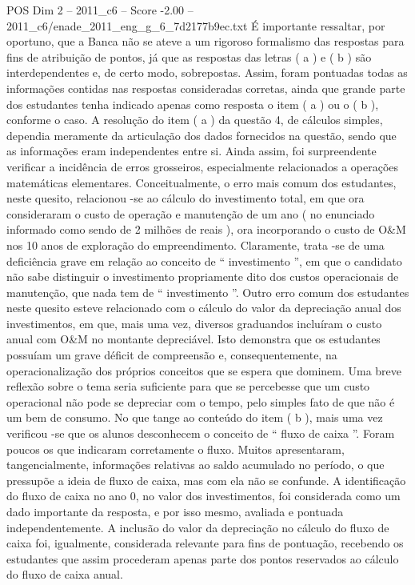 \begin{textsample}{POS Dim 2 – 2011\_c6 – Score -2.00 – 2011\_c6/enade\_2011\_eng\_g\_6\_7d2177b9ec.txt}
É importante ressaltar, por oportuno, que a Banca não se ateve a um rigoroso formalismo das respostas para fins de atribuição de pontos, já que as respostas das letras ( a ) e ( b ) são interdependentes e, de certo modo, sobrepostas.
Assim, foram pontuadas todas as informações contidas nas respostas consideradas corretas, ainda que grande parte dos estudantes tenha indicado apenas como resposta o item ( a ) ou o ( b ), conforme o caso.
A resolução do item ( a ) da questão 4, de cálculos simples, dependia meramente da articulação dos dados fornecidos na questão, sendo que as informações eram independentes entre si.
Ainda assim, foi surpreendente verificar a incidência de erros grosseiros, especialmente relacionados a operações matemáticas elementares.
Conceitualmente, o erro mais comum dos estudantes, neste quesito, relacionou -se ao cálculo do investimento total, em que ora consideraram o custo de operação e manutenção de um ano ( no enunciado informado como sendo de 2 milhões de reais ), ora incorporando o custo de O\&M nos 10 anos de exploração do empreendimento.
Claramente, trata -se de uma deficiência grave em relação ao conceito de “ investimento ”, em que o candidato não sabe distinguir o investimento propriamente dito dos custos operacionais de manutenção, que nada tem de “ investimento ”.
Outro erro comum dos estudantes neste quesito esteve relacionado com o cálculo do valor da depreciação anual dos investimentos, em que, mais uma vez, diversos graduandos incluíram o custo anual com O\&M no montante depreciável.
Isto demonstra que os estudantes possuíam um grave déficit de compreensão e, consequentemente, na operacionalização dos próprios conceitos que se espera que dominem.
Uma breve reflexão sobre o tema seria suficiente para que se percebesse que um custo operacional não pode se depreciar com o tempo, pelo simples fato de que não é um bem de consumo.
No que tange ao conteúdo do item ( b ), mais uma vez verificou -se que os alunos desconhecem o conceito de “ fluxo de caixa ”.
Foram poucos os que indicaram corretamente o fluxo.
Muitos apresentaram, tangencialmente, informações relativas ao saldo acumulado no período, o que pressupõe a ideia de fluxo de caixa, mas com ela não se confunde.
A identificação do fluxo de caixa no ano 0, no valor dos investimentos, foi considerada como um dado importante da resposta, e por isso mesmo, avaliada e pontuada independentemente.
A inclusão do valor da depreciação no cálculo do fluxo de caixa foi, igualmente, considerada relevante para fins de pontuação, recebendo os estudantes que assim procederam apenas parte dos pontos reservados ao cálculo do fluxo de caixa anual.

\end{textsample}
